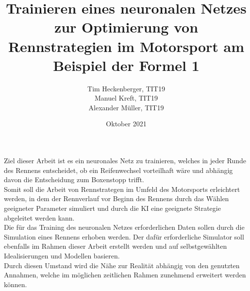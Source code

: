 \documentclass[12pt]{extarticle}
\title{Trainieren eines neuronalen Netzes zur Optimierung von Rennstrategien im Motorsport am Beispiel der Formel 1}
\author{Tim Heckenberger, TIT19 \\ Manuel Kreft, TIT19 \\ Alexander Müller, TIT19}
\date{Oktober 2021}
\begin{document}
\setlength\parindent{0pt}

\maketitle
Ziel dieser Arbeit ist es ein neuronales Netz zu trainieren, welches in jeder Runde des Rennens entscheidet, ob ein Reifenwechsel vorteilhaft wäre und abhängig davon
die Entscheidung zum Boxenstopp trifft.\\
Somit soll die Arbeit von Rennstrategen im Umfeld des Motorsports erleichtert werden, in dem der Rennverlauf vor Beginn des Rennens durch das Wählen geeigneter Parameter simuliert und
durch die KI eine geeignete Strategie abgeleitet werden kann.\\
Die für das Training des neuronalen Netzes erforderlichen Daten sollen durch die Simulation eines Rennens erhoben werden. Der dafür erforderliche Simulator soll ebenfalls
im Rahmen dieser Arbeit erstellt werden und auf selbstgewählten Idealisierungen und Modellen basieren.\\
Durch diesen Umstand wird die Nähe zur Realität abhängig von den genutzten Annahmen, welche im möglichen zeitlichen Rahmen zunehmend erweitert werden können.
\end{document}
